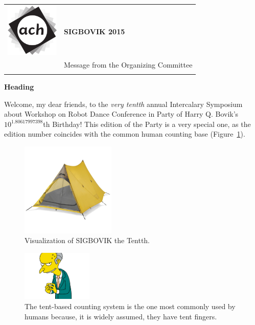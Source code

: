 \documentclass[12pt]{article}
\begin{document}
{\sffamily
\begin{tabular}{ll}
\multirow{3}{*}{\includegraphics[width=1in]{ach.png}}\\
& \textbf{\Huge{SIGBOVIK 2015}} \\ &\\
& \LARGE{Message from the Organizing Committee} \\
&\\
\hline
\end{tabular}}
\vspace{2em}

{\large \bf \sffamily Heading}

Welcome, my dear friends, to the {\em very tentth} annual
Intercalary Symposium about Workshop on Robot Dance Conference in Party of Harry Q. Bovik's $10^{1.80617997398}$th Birthday!
This edition of the Party is a very special one, as the edition number coincides with the common human counting base (Figure~\ref{fig:fingers}).

\begin{figure}[h]
	\includegraphics[width=0.4\textwidth]{tent.jpg}
	\caption{Visualization of SIGBOVIK the Tentth.}
\end{figure}

\begin{figure}[h]
	\includegraphics[width=0.3\textwidth]{tent-fingers.png}
	\caption{The tent-based counting system is the one most commonly used by humans because,
	it is widely assumed, they have tent fingers.} 
	\label{fig:fingers}
\end{figure}
\end{document}

